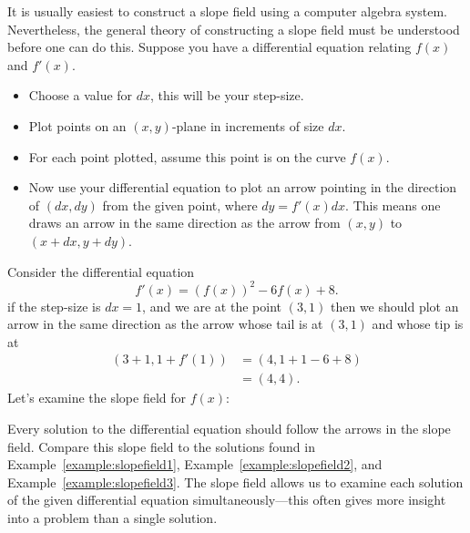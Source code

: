 \begin{procedureForConstructingASlopeField}
It is usually easiest to construct a slope field using a computer
algebra system. Nevertheless, the general theory of constructing a
slope field must be understood before one can do this.  Suppose you
have a differential equation relating $f(x)$ and $f'(x)$.
\begin{itemize}
\item Choose a value for $dx$, this will be your step-size.
\item Plot points on an $(x,y)$-plane in increments of size $dx$. 
\item For each point plotted, assume this point is on the curve $f(x)$. 
\item Now use your differential equation to plot an arrow pointing in
  the direction of $(dx,dy)$ from the given point, where $dy =
  f'(x)dx$. This means one draws an arrow in the same direction as the
  arrow from $(x,y)$ to $(x + dx, y + dy)$.
\end{itemize}
\end{procedureForConstructingASlopeField}

Consider the differential equation
\[
f'(x) = \left(f(x)\right)^2 - 6f(x) + 8.
\]
if the step-size is $dx =1$, and we are at the point $(3,1)$ then we
should plot an arrow in the same direction as the arrow whose tail is
at $(3,1)$ and whose tip is at
\begin{align*}
(3+1,1 + f'(1))  &= (4, 1 +1 -6+8)\\
&= (4,4).
\end{align*}
Let's examine the slope field for $f(x)$:

{\def\length{sqrt(1+(y^2-6*y+8)^2)}
}

Every solution to the differential equation should follow the arrows
in the slope field.  Compare this slope field to the solutions found
in Example~\ref{example:slopefield1},
Example~\ref{example:slopefield2}, and
Example~\ref{example:slopefield3}. The slope field allows us to
examine each solution of the given differential equation
simultaneously---this often gives more insight into a problem than a
single solution.

